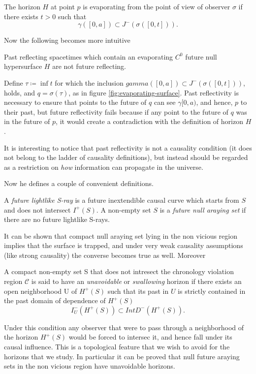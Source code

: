 	\begin{definition}
		The horizon \(H\) at point \(p\) is evaporating from the point of view of observer \(\sigma\) if there exists \(t > 0\) such that
		\[
		\gamma \left([0, a]\right) \subset J^-\left(\sigma\left([0, t]\right)\right).	
		\] 
	\end{definition}
	Now the following becomes more intuitive
	\begin{theorem}
		Past reflecting spacetimes which contain an evaporating \(C^0\) future null hypersurface \(H\) are not future reflecting.
	\end{theorem}
	Define \(\tau \coloneqq \inf t\) for which the inclusion \(gamma \left([0, a]\right) \subset J^-\left(\sigma\left([0, t]\right)\right)\), holds, and \(q = \sigma(\tau)\), as in figure \ref{fig:evaporating-surface}.
	Past reflectivity is necessary to ensure that points to the future of \(q\) can see \(\gamma[0,a)\), and hence, \(p\) to their past, but future reflectivity fails because if any point to the future of \(q\) was in the future of \(p\), it would create a contradiction with the definition of horizon \(H\). 
	\begin{remark}
		It is interesting to notice that past reflectivity is not a causality condition (it does not belong to the ladder of causality definitions), but instead should be regarded as a restriction on \emph{how} information can propagate in the universe.
	\end{remark}

	Now he defines a couple of convenient definitions.
	\begin{definition}
		A \emph{future lightlike S-ray} is a future inextendible causal curve which starts from \(S\) and does not intersect \(I^+(S)\). A non-empty set \(S\) is a \emph{future null araying set} if there are no future lightlike S-rays. 
	\end{definition}
	It can be shown that compact null araying set lying in the non vicious region implies that the surface is trapped, and under very weak causality assumptions (like strong causality) the converse becomes true as well. Moreover
	\begin{definition}
		A compact non-empty set S that does not intresect the chronology violation region \(\mathcal{C}\) is said to have an \emph{unavoidable} or \emph{swallowing} horizon if there exists an open neighborhood U of \(H^+(S)\) such that its past in \(U\) is strictly contained in the past domain of dependence of \(H^+(S)\) 
		\[
			I^-_U(H^+(S)) \subset Int D^-(H^+(S)).	
		\]
	\end{definition}
	Under this condition any observer that were to pass through a neighborhood of the horizon \(H^+(S)\) would be forced to intersec it, and hence fall under its causal influence. This is a topological feature that we wish to avoid for the horizons that we study. In particular it can be proved that null future araying sets in the non vicious region have unavoidable horizons.

